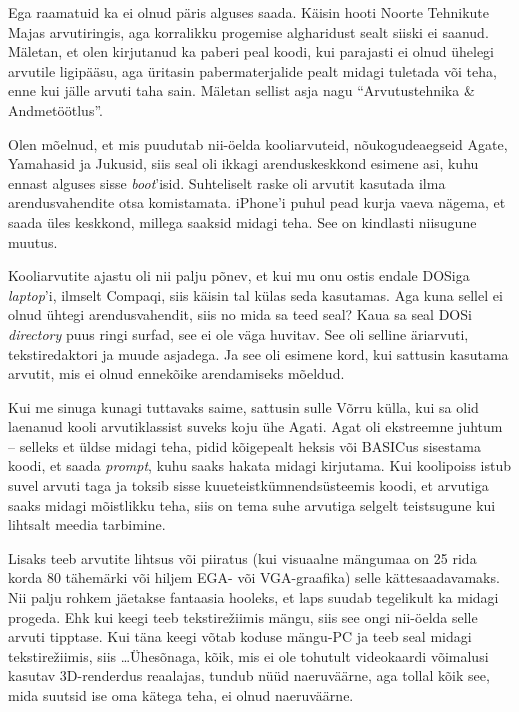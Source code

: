Ega raamatuid ka ei olnud päris alguses saada. Käisin hooti
Noorte Tehnikute Majas 
arvutiringis, aga korralikku progemise algharidust sealt siiski ei saanud. Mäletan, et 
olen kirjutanud ka paberi peal koodi, kui parajasti 
ei olnud ühelegi arvutile ligipääsu, aga üritasin pabermaterjalide pealt 
midagi tuletada või teha, enne kui jälle arvuti taha sain. Mäletan sellist asja nagu
\enquote{Arvutustehnika \& Andmetöötlus}. 


Olen mõelnud, et mis puudutab 
nii-öelda kooliarvuteid, nõukogudeaegseid Agate, 
Yamahasid ja Jukusid, siis seal oli 
ikkagi arenduskeskkond esimene asi, kuhu ennast alguses sisse 
\emph{boot}'isid. Suhteliselt raske oli arvutit kasutada ilma
arendusvahendite otsa komistamata. iPhone'i puhul pead kurja 
vaeva nägema, et saada üles keskkond, millega saaksid midagi teha. See 
on kindlasti niisugune muutus. 

Kooliarvutite ajastu oli nii 
palju põnev, et kui mu onu ostis endale DOSiga \emph{laptop}'i, ilmselt Compaqi, siis käisin tal külas seda kasutamas. Aga kuna sellel ei olnud ühtegi arendusvahendit, siis no mida sa 
teed seal? Kaua sa seal DOSi \emph{directory} puus ringi surfad, see ei ole väga huvitav. See oli selline äriarvuti, tekstiredaktori ja muude asjadega. Ja see oli
esimene kord, kui 
sattusin kasutama arvutit, mis ei olnud ennekõike arendamiseks mõeldud. 

Kui me sinuga kunagi tuttavaks saime, sattusin sulle Võrru 
külla, kui sa olid laenanud kooli arvutiklassist suveks koju ühe 
Agati. Agat oli ekstreemne juhtum -- selleks et üldse midagi teha, pidid kõigepealt heksis või BASICus 
sisestama koodi, et saada \emph{prompt}, kuhu saaks hakata midagi 
kirjutama. Kui koolipoiss istub suvel arvuti taga ja toksib sisse 
kuueteistkümnendsüsteemis koodi, et arvutiga saaks midagi 
mõistlikku teha, siis on tema suhe arvutiga selgelt teistsugune kui 
lihtsalt meedia tarbimine. 

Lisaks teeb arvutite lihtsus või piiratus (kui 
visuaalne mängumaa on 25 rida korda 80 tähemärki või hiljem EGA- või 
VGA-graafika) selle kättesaadavamaks. Nii palju rohkem jäetakse 
fantaasia hooleks, et laps suudab tegelikult ka midagi progeda. Ehk kui keegi 
teeb tekstirežiimis mängu, siis see ongi nii-öelda selle arvuti tipptase. 
Kui täna keegi võtab koduse mängu-PC ja teeb seal midagi 
tekstirežiimis, siis \dots Ühesõnaga, kõik, mis ei ole tohutult videokaardi 
võimalusi kasutav 3D-renderdus reaalajas, tundub nüüd naeruväärne, aga tollal 
kõik see, mida suutsid ise oma kätega teha, ei olnud naeruväärne. 

